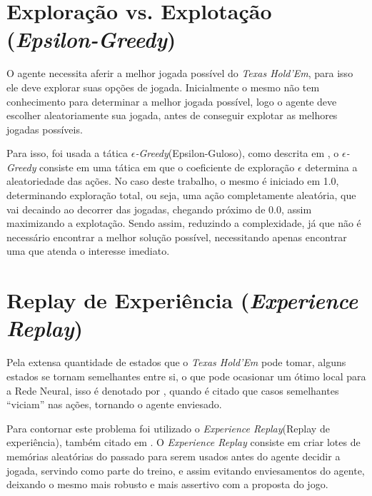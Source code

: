 \section{Exploração vs. Explotação (\textit{Epsilon-Greedy})}

O agente necessita aferir a melhor jogada possível do \textit{Texas Hold'Em}, para isso ele deve explorar suas opções de jogada. Inicialmente o mesmo não tem conhecimento para determinar a melhor jogada possível, logo o agente deve escolher aleatoriamente sua jogada, antes de conseguir explotar as melhores jogadas possíveis.

Para isso, foi usada a tática \textit{$\epsilon$-Greedy}(Epsilon-Guloso), como descrita em , o \textit{$\epsilon$-Greedy} consiste em uma tática em que o coeficiente de exploração $\epsilon$ determina a aleatoriedade das ações. No caso deste trabalho, o mesmo é iniciado em 1.0, determinando exploração total, ou seja, uma ação completamente aleatória, que vai decaindo ao decorrer das jogadas, chegando próximo de 0.0, assim maximizando a explotação. Sendo assim, reduzindo a complexidade, já que não é necessário encontrar a melhor solução possível, necessitando apenas encontrar uma que atenda o interesse imediato.

\section{Replay de Experiência (\textit{Experience Replay})}

Pela extensa quantidade de estados que o \textit{Texas Hold'Em} pode tomar, alguns estados se tornam semelhantes entre si, o que pode ocasionar um ótimo local para a Rede Neural, isso é denotado por , quando é citado que casos semelhantes ``viciam'' nas ações, tornando o agente enviesado.

Para contornar este problema foi utilizado o \textit{Experience Replay}(Replay de experiência), também citado em . O \textit{Experience Replay} consiste em criar lotes de memórias aleatórias do passado para serem usados antes do agente decidir a jogada, servindo como parte do treino, e assim evitando enviesamentos do agente, deixando o mesmo mais robusto e mais assertivo com a proposta do jogo.